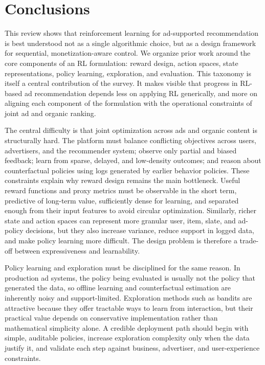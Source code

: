 \documentclass[manuscript,review,screen]{acmart}
\begin{document}
\section{Conclusions}

This review shows that reinforcement learning for ad-supported recommendation is best understood not as a single algorithmic choice, but as a design framework for sequential, monetization-aware control. We organize prior work around the core components of an RL formulation: reward design, action spaces, state representations, policy learning, exploration, and evaluation. This taxonomy is itself a central contribution of the survey. It makes visible that progress in RL-based ad recommendation depends less on applying RL generically, and more on aligning each component of the formulation with the operational constraints of joint ad and organic ranking.

The central difficulty is that joint optimization across ads and organic content is structurally hard. The platform must balance conflicting objectives across users, advertisers, and the recommender system; observe only partial and biased feedback; learn from sparse, delayed, and low-density outcomes; and reason about counterfactual policies using logs generated by earlier behavior policies. These constraints explain why reward design remains the main bottleneck. Useful reward functions and proxy metrics must be observable in the short term, predictive of long-term value, sufficiently dense for learning, and separated enough from their input features to avoid circular optimization. Similarly, richer state and action spaces can represent more granular user, item, slate, and ad-policy decisions, but they also increase variance, reduce support in logged data, and make policy learning more difficult. The design problem is therefore a trade-off between expressiveness and learnability.

Policy learning and exploration must be disciplined for the same reason. In production ad systems, the policy being evaluated is usually not the policy that generated the data, so offline learning and counterfactual estimation are inherently noisy and support-limited. Exploration methods such as bandits are attractive because they offer tractable ways to learn from interaction, but their practical value depends on conservative implementation rather than mathematical simplicity alone. A credible deployment path should begin with simple, auditable policies, increase exploration complexity only when the data justify it, and validate each step against business, advertiser, and user-experience constraints.
\end{document}
